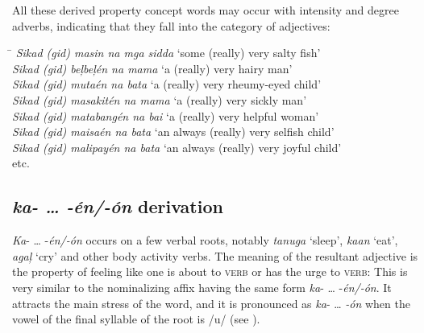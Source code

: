 All these derived property concept words may occur with intensity and degree adverbs, indicating that they fall into the category of adjectives:

\ea
\label{bkm:Ref422804351}
\begin{tabbing}
\hspace{5cm} \= \kill
\textit{Sikad (gid) masin na mga sidda} \> ‘some (really) very salty fish’ \\
\textit{Sikad (gid) beļbeļén na mama}
\> ‘a (really) very hairy man’ \\
\textit{Sikad (gid) mutaén na bata} \> ‘a (really) very rheumy-eyed child’ \\
\textit{Sikad (gid) masakitén na mama} \> ‘a (really) very sickly man’ \\
\textit{Sikad (gid) matabangén na bai} \> ‘a (really) very helpful woman’ \\
\textit{Sikad (gid) maisaén na bata} \> ‘an always (really) very selfish child’ \\
\textit{Sikad (gid) malipayén na bata} \> ‘an always (really) very joyful child’ \\
etc.
\end{tabbing}
\z
\subsection{\textit{ka- … -én/-ón} derivation}
\label{sec:ka-en-derivation}
\textit{Ka}{}- … -\textit{én/-ón} occurs on a few verbal roots, notably \textit{tanuga} ‘sleep’, \textit{kaan} ‘eat’, \textit{agaļ} ‘cry’ and other body activity verbs. The meaning of the resultant adjective is the property of feeling like one is about to \textsc{verb} or has the urge to \textsc{verb}: This is very similar to the nominalizing affix having the same form \textit{ka}{}- … -\textit{én/-ón}. It attracts the main stress of the word, and it is pronounced as \textit{ka}{}- … \textit{{}-ón} when the vowel of the final syllable of the root is /u/ (see  ).

